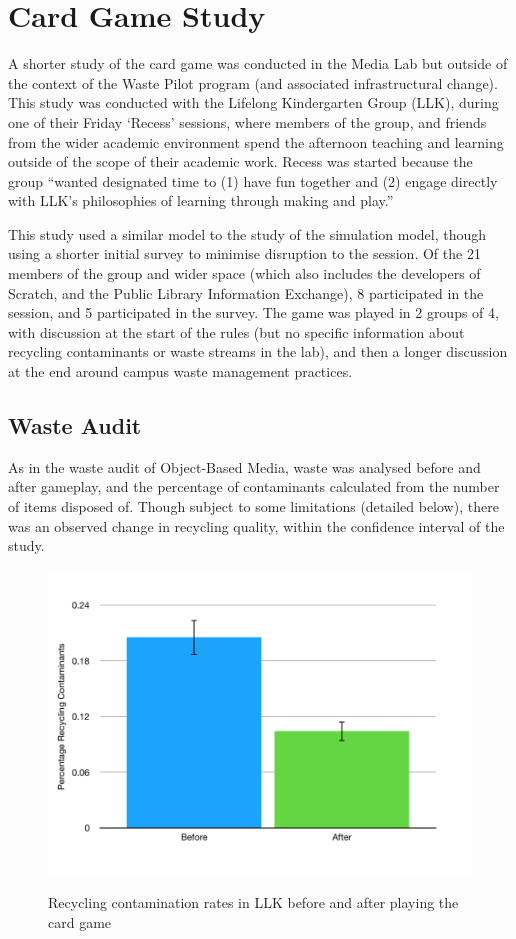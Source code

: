\documentclass[nofonts,nols,justified,nobib]{tufte-book}
\begin{document}
\section*{Card Game Study}
A shorter study of the card game was conducted in the Media Lab but outside of the context of the Waste Pilot program (and associated infrastructural change). This study was conducted with the Lifelong Kindergarten Group (LLK), during one of their Friday `Recess' sessions, where members of the group, and friends from the wider academic environment spend the afternoon teaching and learning outside of the scope of their academic work. Recess was started because the group ``wanted designated time to (1) have fun together and (2) engage directly with LLK's philosophies of learning through making and play.'' \cite{otts_e-mail_2019}

This study used a similar model to the study of the simulation model, though using a shorter initial survey to minimise disruption to the session. Of the 21 members of the group and wider space (which also includes the developers of Scratch, and the Public Library Information Exchange), 8 participated in the session, and 5 participated in the survey. The game was played in 2 groups of 4, with discussion at the start of the rules (but no specific information about recycling contaminants or waste streams in the lab), and then a longer discussion at the end around campus waste management practices.

\subsection*{Waste Audit}
As in the waste audit of Object-Based Media, waste was analysed before and after gameplay, and the percentage of contaminants calculated from the number of items disposed of. Though subject to some limitations (detailed below), there was an observed change in recycling quality, within the confidence interval of the study.


\begin{figure}
  \caption{Recycling contamination rates in LLK before and after playing the card game}
  \includegraphics[width=1\linewidth]{img/4/llk-audit.png}
  \label{contamination}
\end{figure}
\end{document}
